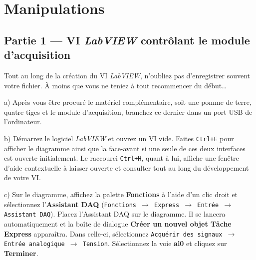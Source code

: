 \documentclass[canadien,12pt,oneside,letterpaper]{article}
\begin{document}
\section{Manipulations} \label{sec:manip}

\setlength{\parskip}{1ex plus 0.5ex minus 0.2ex}




\subsection{Partie 1 --- VI \textit{LabVIEW} contrôlant le module d'acquisition}

Tout au long de la création du VI \textit{LabVIEW}, n'oubliez pas d'enregistrer souvent votre fichier. À moins que vous ne teniez à tout recommencer du début\dots

a) Après vous être procuré le matériel complémentaire, soit une pomme de terre, quatre tiges et le module d'acquisition, branchez ce dernier dans un port USB de l'ordinateur.

b) Démarrez le logiciel \textit{LabVIEW} et ouvrez un VI vide. Faites \texttt{Ctrl+E} pour afficher le diagramme ainsi que la face-avant si une seule de ces deux interfaces est ouverte initialement. Le raccourci \texttt{Ctrl+H}, quant à lui, affiche une fenêtre d'aide contextuelle à laisser ouverte et consulter tout au long du développement de votre VI.

c) Sur le diagramme, affichez la palette \textbf{Fonctions} à l'aide d'un clic droit et sélectionnez l'\textbf{Assistant DAQ} (\texttt{Fonctions $\rightarrow$ Express $\rightarrow$ Entrée $\rightarrow$ Assistant DAQ}). Placez l'Assistant DAQ sur le diagramme. Il se lancera automatiquement et la boîte de dialogue \textbf{Créer un nouvel objet Tâche Express} apparaîtra. Dans celle-ci, sélectionnez \texttt{Acquérir des signaux $\rightarrow$ Entrée analogique $\rightarrow$ Tension}. Sélectionnez la voie \textbf{ai0} et cliquez sur \textbf{Terminer}.
\end{document}
